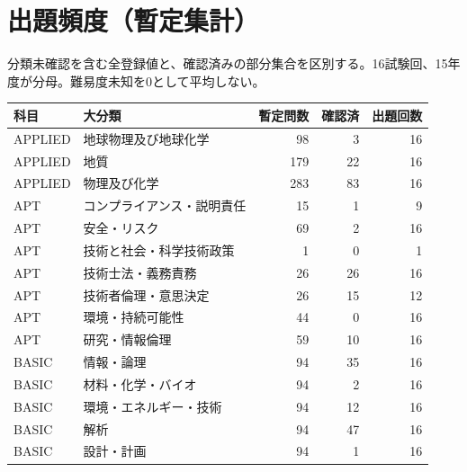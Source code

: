 \chapter{出題頻度（暫定集計）}
分類未確認を含む全登録値と、確認済みの部分集合を区別する。16試験回、15年度が分母。難易度未知を0として平均しない。
\begin{longtable}{p{.16\linewidth}p{.42\linewidth}rrr}
科目 & 大分類 & 暫定問数 & 確認済 & 出題回数\\\hline
APPLIED & 地球物理及び地球化学 & 98 & 3 & 16\\
APPLIED & 地質 & 179 & 22 & 16\\
APPLIED & 物理及び化学 & 283 & 83 & 16\\
APT & コンプライアンス・説明責任 & 15 & 1 & 9\\
APT & 安全・リスク & 69 & 2 & 16\\
APT & 技術と社会・科学技術政策 & 1 & 0 & 1\\
APT & 技術士法・義務責務 & 26 & 26 & 16\\
APT & 技術者倫理・意思決定 & 26 & 15 & 12\\
APT & 環境・持続可能性 & 44 & 0 & 16\\
APT & 研究・情報倫理 & 59 & 10 & 16\\
BASIC & 情報・論理 & 94 & 35 & 16\\
BASIC & 材料・化学・バイオ & 94 & 2 & 16\\
BASIC & 環境・エネルギー・技術 & 94 & 12 & 16\\
BASIC & 解析 & 94 & 47 & 16\\
BASIC & 設計・計画 & 94 & 1 & 16\\
\end{longtable}
